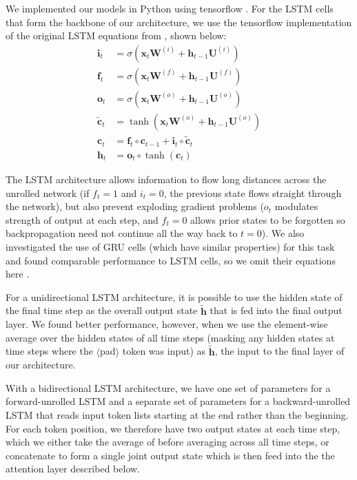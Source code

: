 \documentclass{article} %
\begin{document}
We implemented our models in Python using tensorflow \cite{tensorflow}. For the LSTM cells that form the backbone of our architecture, we use the tensorflow implementation of the original LSTM equations from \cite{lstm}, shown below:
\begin{align*}
	\bm{i}_t &= \sigma \left(\bm{x}_t \bm{W}^{(i)} + \bm{h}_{t-1} \bm{U}^{(i)}\right) \\ 
    \bm{f}_t &= \sigma \left(\bm{x}_t \bm{W}^{(f)} + \bm{h}_{t-1} \bm{U}^{(f)}\right) \\ 
    \bm{o}_t &= \sigma \left(\bm{x}_t \bm{W}^{(o)} + \bm{h}_{t-1} \bm{U}^{(o)}\right) \\ 
    \bm{\tilde{c}}_t &= \tanh \left(\bm{x}_t \bm{W}^{(o)} + \bm{h}_{t-1} \bm{U}^{(o)}\right) \\ 
    \bm{c}_t &= \bm{f}_t \circ \bm{c}_{t-1} + \bm{i}_t \circ \bm{\tilde{c}}_t \\
    \bm{h}_t &= \bm{o}_t \circ \tanh (\bm{c}_t)
    \label{eqn:lstm}
\end{align*}

The LSTM architecture allows information to flow long distances across the unrolled network (if $f_t = 1$ and $i_t = 0$, the previous state flows straight through the network), but also prevent exploding gradient problems ($o_t$ modulates strength of output at each step, and $f_t = 0$ allows prior states to be forgotten so backpropagation need not continue all the way back to $t=0$). We also investigated the use of GRU cells (which have similar properties) for this task and found comparable performance to LSTM cells, so we omit their equations here \cite{gru}.

For a unidirectional LSTM architecture, it is possible to use the hidden state of the final time step as the overall output state $\bm{\tilde{h}}$ that is fed into the final output layer. We found better performance, however, when we use the element-wise average over the hidden states of all time steps (masking any hidden states at time steps where the $\langle$pad$\rangle$ token was input) as $\bm{\tilde{h}}$, the input to the final layer of our architecture.

With a bidirectional LSTM architecture, we have one set of parameters for a forward-unrolled LSTM and a separate set of parameters for a backward-unrolled LSTM that reads input token lists starting at the end rather than the beginning. For each token position, we therefore have two output states at each time step, which we either take the average of before averaging across all time steps, or concatenate to form a single joint output state which is then feed into the the attention layer described below. 
\end{document}
